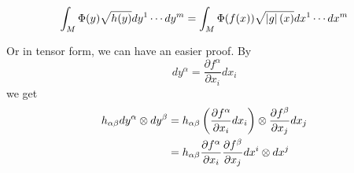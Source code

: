 \begin{enumerate}[label=\arabic{*}.]
\begin{equation*}
		\int_M \Phi(y)\sqrt{h(y)}dy^1\cdots dy^m = \int_M\Phi(f(x))\sqrt{\left\lvert g\right\lvert(x)}dx^1\cdots dx^m
	\end{equation*}
	\begin{rmk}
		Or in tensor form, we can have an easier proof. By
		\begin{equation*}
			dy^\alpha = \frac{\partial f^\alpha}{\partial x_i} dx_i
		\end{equation*}
		we get
		\begin{equation*}
			\begin{aligned}
				h_{\alpha \beta} dy^\alpha \otimes dy^\beta &= h_{\alpha \beta} \left(\frac{\partial f^\alpha}{\partial x_i} dx_i\right) \otimes \frac{\partial f^\beta}{\partial x_j} dx_j \\
				&= h_{\alpha \beta}\frac{\partial f^\alpha}{\partial x_i}\frac{\partial f^\beta}{\partial x_j}dx^i\otimes dx^j
			\end{aligned}
		\end{equation*}
	\end{rmk}


\end{enumerate}
